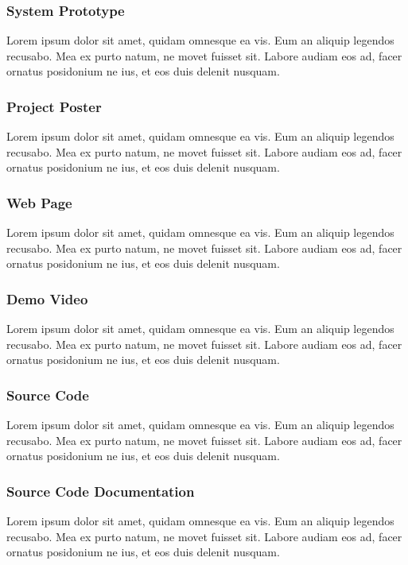 \subsubsection{System Prototype}
Lorem ipsum dolor sit amet, quidam omnesque ea vis. Eum an aliquip legendos recusabo. Mea ex purto natum, ne movet fuisset sit. Labore audiam eos ad, facer ornatus posidonium ne ius, et eos duis delenit nusquam.

\subsubsection{Project Poster}
Lorem ipsum dolor sit amet, quidam omnesque ea vis. Eum an aliquip legendos recusabo. Mea ex purto natum, ne movet fuisset sit. Labore audiam eos ad, facer ornatus posidonium ne ius, et eos duis delenit nusquam.

\subsubsection{Web Page}
Lorem ipsum dolor sit amet, quidam omnesque ea vis. Eum an aliquip legendos recusabo. Mea ex purto natum, ne movet fuisset sit. Labore audiam eos ad, facer ornatus posidonium ne ius, et eos duis delenit nusquam.

\subsubsection{Demo Video}
Lorem ipsum dolor sit amet, quidam omnesque ea vis. Eum an aliquip legendos recusabo. Mea ex purto natum, ne movet fuisset sit. Labore audiam eos ad, facer ornatus posidonium ne ius, et eos duis delenit nusquam.

\subsubsection{Source Code}
Lorem ipsum dolor sit amet, quidam omnesque ea vis. Eum an aliquip legendos recusabo. Mea ex purto natum, ne movet fuisset sit. Labore audiam eos ad, facer ornatus posidonium ne ius, et eos duis delenit nusquam.

\subsubsection{Source Code Documentation}
Lorem ipsum dolor sit amet, quidam omnesque ea vis. Eum an aliquip legendos recusabo. Mea ex purto natum, ne movet fuisset sit. Labore audiam eos ad, facer ornatus posidonium ne ius, et eos duis delenit nusquam.

